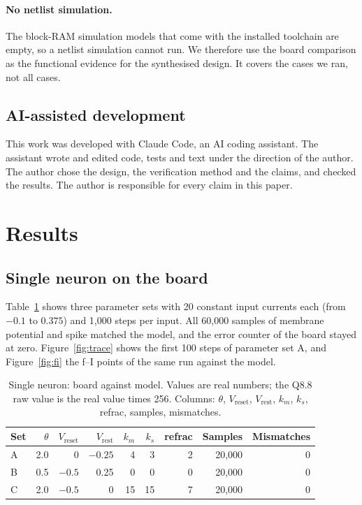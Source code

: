 \documentclass[11pt]{article}
\begin{document}
\paragraph{No netlist simulation.}
The block-RAM simulation models that come with the installed toolchain are empty, so a netlist simulation cannot run.
We therefore use the board comparison as the functional evidence for the synthesised design. It covers the cases we ran, not all cases.

\subsection{AI-assisted development}
This work was developed with Claude Code, an AI coding assistant. The assistant wrote and edited code, tests and text under the direction of the author. The author chose the design, the verification method and the claims, and checked the results. The author is responsible for every claim in this paper.

\section{Results}
\label{sec:results}
\subsection{Single neuron on the board}
Table~\ref{tab:m2} shows three parameter sets with 20 constant input currents each (from $-0.1$ to $0.375$) and 1,000 steps per input.
All 60,000 samples of membrane potential and spike matched the model, and the error counter of the board stayed at zero.
Figure~\ref{fig:trace} shows the first 100 steps of parameter set A, and Figure~\ref{fig:fi} the f--I points of the same run against the model.

\begin{table}[t]
\centering
\caption{Single neuron: board against model. Values are real numbers; the Q8.8 raw value is the real value times 256. Columns: $\theta$, $V_{\mathrm{reset}}$, $V_{\mathrm{rest}}$, $k_m$, $k_s$, refrac, samples, mismatches.}
\label{tab:m2}
\setlength{\tabcolsep}{7pt}
\begin{tabular}{lrrrrrrrr}
\toprule
Set & $\theta$ & $V_{\mathrm{reset}}$ & $V_{\mathrm{rest}}$ & $k_m$ & $k_s$ & refrac & Samples & Mismatches \\
\midrule
A & 2.0 & 0 & $-0.25$ & 4 & 3 & 2 & 20,000 & 0 \\
B & 0.5 & $-0.5$ & 0.25 & 0 & 0 & 0 & 20,000 & 0 \\
C & 2.0 & $-0.5$ & 0 & 15 & 15 & 7 & 20,000 & 0 \\
\bottomrule
\end{tabular}
\end{table}
\end{document}
